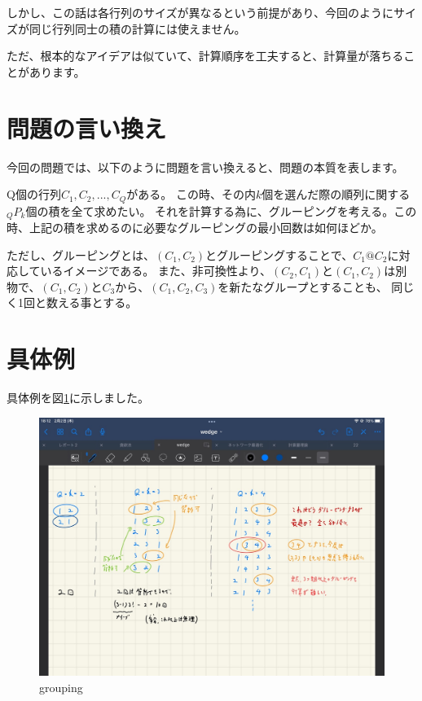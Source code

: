 \documentclass[a4paper, 10pt, dvipdfmx]{jlreq}
\begin{document}
しかし、この話は各行列のサイズが異なるという前提があり、今回のようにサイズが同じ行列同士の積の計算には使えません。

ただ、根本的なアイデアは似ていて、計算順序を工夫すると、計算量が落ちることがあります。

\section{問題の言い換え}

今回の問題では、以下のように問題を言い換えると、問題の本質を表します。

Q個の行列$C_1,C_2,...,C_Q$がある。
この時、その内$k$個を選んだ際の順列に関する${}_Q P_k$個の積を全て求めたい。
それを計算する為に、グルーピングを考える。この時、上記の積を求めるのに必要なグルーピングの最小回数は如何ほどか。

ただし、グルーピングとは、$(C_1,C_2)$とグルーピングすることで、$C_1 @ C_2$に対応しているイメージである。
また、非可換性より、$(C_2,C_1)$と$(C_1,C_2)$は別物で、$(C_1,C_2)$と$C_3$から、$(C_1,C_2,C_3)$を新たなグループとすることも、
同じく1回と数える事とする。

\section{具体例}

具体例を図\ref{img:grouping}に示しました。

\begin{figure}[htbp]
    \begin{center}
        \includegraphics[width=150mm]{grouping.jpg}
        \caption{grouping}
        \label{img:grouping}
    \end{center}
\end{figure}
\end{document}

